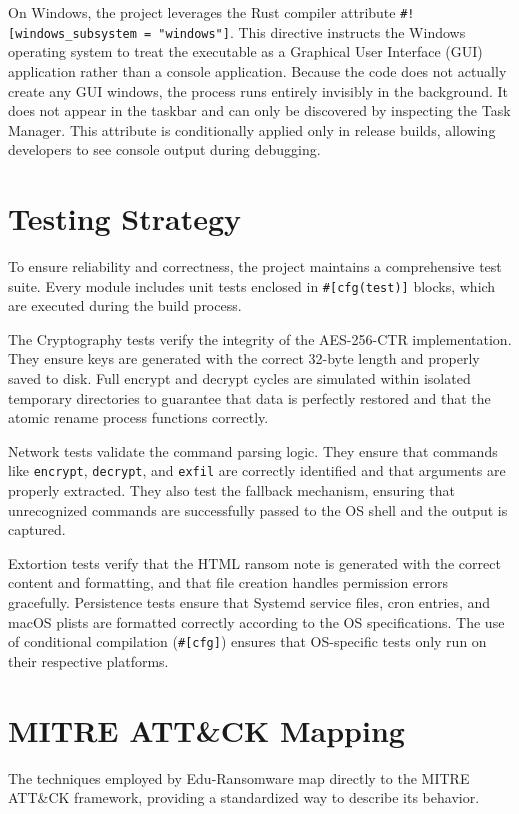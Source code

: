 \documentclass[12pt,a4paper]{article}
\newcommand{\code}[1]{\texttt{\textcolor{primaryblue}{#1}}}
\begin{document}
On Windows, the project leverages the Rust compiler attribute \code{\#![windows\_subsystem = "windows"]}. This directive instructs the Windows operating system to treat the executable as a Graphical User Interface (GUI) application rather than a console application. Because the code does not actually create any GUI windows, the process runs entirely invisibly in the background. It does not appear in the taskbar and can only be discovered by inspecting the Task Manager. This attribute is conditionally applied only in release builds, allowing developers to see console output during debugging.

\section{Testing Strategy}

To ensure reliability and correctness, the project maintains a comprehensive test suite. Every module includes unit tests enclosed in \code{\#[cfg(test)]} blocks, which are executed during the build process.

The Cryptography tests verify the integrity of the AES-256-CTR implementation. They ensure keys are generated with the correct 32-byte length and properly saved to disk. Full encrypt and decrypt cycles are simulated within isolated temporary directories to guarantee that data is perfectly restored and that the atomic rename process functions correctly.

Network tests validate the command parsing logic. They ensure that commands like \code{encrypt}, \code{decrypt}, and \code{exfil} are correctly identified and that arguments are properly extracted. They also test the fallback mechanism, ensuring that unrecognized commands are successfully passed to the OS shell and the output is captured.

Extortion tests verify that the HTML ransom note is generated with the correct content and formatting, and that file creation handles permission errors gracefully. Persistence tests ensure that Systemd service files, cron entries, and macOS plists are formatted correctly according to the OS specifications. The use of conditional compilation (\code{\#[cfg]}) ensures that OS-specific tests only run on their respective platforms.

\section{MITRE ATT\&CK Mapping}

The techniques employed by Edu-Ransomware map directly to the MITRE ATT\&CK framework, providing a standardized way to describe its behavior.
\end{document}

